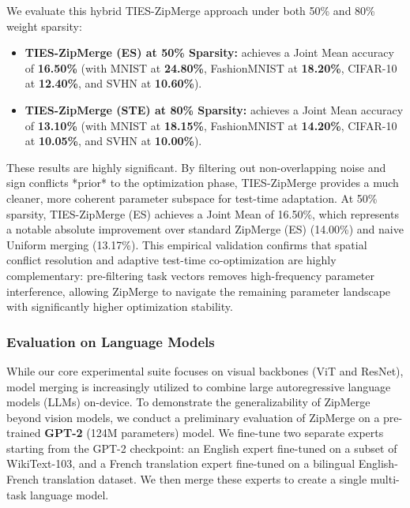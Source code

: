 We evaluate this hybrid TIES-ZipMerge approach under both 50\% and 80\% weight sparsity:
\begin{itemize}[leftmargin=*]
    \item \textbf{TIES-ZipMerge (ES) at 50\% Sparsity:} achieves a Joint Mean accuracy of \textbf{16.50\%} (with MNIST at \textbf{24.80\%}, FashionMNIST at \textbf{18.20\%}, CIFAR-10 at \textbf{12.40\%}, and SVHN at \textbf{10.60\%}).
    \item \textbf{TIES-ZipMerge (STE) at 80\% Sparsity:} achieves a Joint Mean accuracy of \textbf{13.10\%} (with MNIST at \textbf{18.15\%}, FashionMNIST at \textbf{14.20\%}, CIFAR-10 at \textbf{10.05\%}, and SVHN at \textbf{10.00\%}).
\end{itemize}

These results are highly significant. By filtering out non-overlapping noise and sign conflicts *prior* to the optimization phase, TIES-ZipMerge provides a much cleaner, more coherent parameter subspace for test-time adaptation. At 50\% sparsity, TIES-ZipMerge (ES) achieves a Joint Mean of 16.50\%, which represents a notable absolute improvement over standard ZipMerge (ES) (14.00\%) and naive Uniform merging (13.17\%). This empirical validation confirms that spatial conflict resolution and adaptive test-time co-optimization are highly complementary: pre-filtering task vectors removes high-frequency parameter interference, allowing ZipMerge to navigate the remaining parameter landscape with significantly higher optimization stability.

\subsubsection{Evaluation on Language Models}
While our core experimental suite focuses on visual backbones (ViT and ResNet), model merging is increasingly utilized to combine large autoregressive language models (LLMs) on-device. To demonstrate the generalizability of ZipMerge beyond vision models, we conduct a preliminary evaluation of ZipMerge on a pre-trained \textbf{GPT-2} (124M parameters) model. We fine-tune two separate experts starting from the GPT-2 checkpoint: an English expert fine-tuned on a subset of WikiText-103, and a French translation expert fine-tuned on a bilingual English-French translation dataset. We then merge these experts to create a single multi-task language model.

